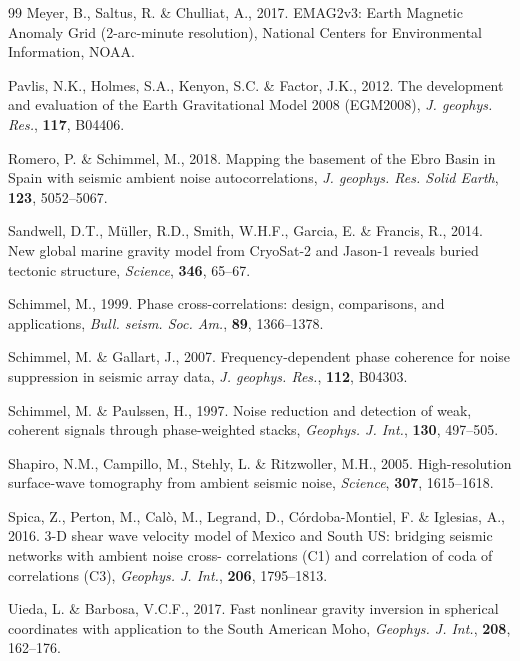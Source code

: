 \begin{thebibliography}{99}
 Meyer, B., Saltus, R. \& Chulliat, A.,
2017. EMAG2v3: Earth Magnetic Anomaly Grid (2-arc-minute resolution), National
Centers for Environmental Information, NOAA.

 Pavlis, N.K., Holmes, S.A., Kenyon,
S.C. \& Factor, J.K., 2012. The development and evaluation of the Earth
Gravitational Model 2008 (EGM2008), \emph{J. geophys. Res.}, \textbf{117}, B04406.

 Romero, P. \& Schimmel, M., 2018.
Mapping the basement of the Ebro Basin in Spain with seismic ambient noise
autocorrelations, \emph{J. geophys. Res. Solid Earth}, \textbf{123}, 5052--5067.

 Sandwell, D.T., M\"uller, R.D.,
Smith, W.H.F., Garcia, E. \& Francis, R., 2014. New global marine gravity model
from CryoSat-2 and Jason-1 reveals buried tectonic structure, \emph{Science},
\textbf{346}, 65--67.

 Schimmel, M., 1999. Phase cross-correlations:
design, comparisons, and applications, \emph{Bull. seism. Soc. Am.}, \textbf{89},
1366--1378.

 Schimmel, M. \& Gallart,
J., 2007. Frequency-dependent phase coherence for noise suppression in seismic
array data, \emph{J. geophys. Res.}, \textbf{112}, B04303.

 Schimmel, M. \&
Paulssen, H., 1997. Noise reduction and detection of weak, coherent signals
through phase-weighted stacks, \emph{Geophys. J. Int.}, \textbf{130}, 497--505.

 Shapiro, N.M., Campillo, M., Stehly,
L. \& Ritzwoller, M.H., 2005. High-resolution surface-wave tomography from ambient
seismic noise, \emph{Science}, \textbf{307}, 1615--1618.

 Spica, Z., Perton, M., Calò, M., Legrand,
D., C\'ordoba-Montiel, F. \& Iglesias, A., 2016. 3-D shear wave velocity model of
Mexico and South US: bridging seismic networks with ambient noise cross-
correlations (C1) and correlation of coda of correlations (C3), \emph{Geophys. J.
Int.}, \textbf{206}, 1795--1813.

 Uieda, L. \& Barbosa, V.C.F., 2017.
Fast nonlinear gravity inversion in spherical coordinates with application to the
South American Moho, \emph{Geophys. J. Int.}, \textbf{208}, 162--176.


\end{thebibliography}
